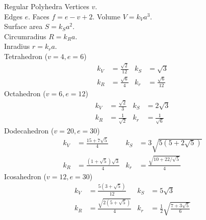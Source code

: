 \begin{algorithm}{Regular Polyhedra}
\desc
Vertices $v$.\\
Edges $e$.
Faces $f = e-v+2$.
Volume $V = k_V a^3$.\\
Surface area $S = k_S a^2$.\\
Circumradius $R = k_R a$.\\
Inradius $r = k_r a$.\\

Tetrahedron ($v = 4, e = 6$)
\begin{align*} 
  k_V &= \frac{\sqrt{2}}{12} & k_S &= \sqrt{3}\\
  k_R &= \frac{\sqrt{6}}{4}    & k_r &= \frac{\sqrt{6}}{12}
\end{align*}
Octahedron ($v = 6, e = 12$)
\begin{align*} 
  k_V &= \frac{\sqrt{2}}{3} & k_S &= 2\sqrt{3}\\
  k_R &= \frac{1}{\sqrt{2}}    & k_r &= \frac{1}{\sqrt{6}}
\end{align*}
Dodecahedron ($v = 20, e = 30$)
\begin{align*} 
  k_V &= \frac{15 + 7\sqrt{5}}{4} & k_S &= 3\sqrt{5(5+2\sqrt{5})}\\
  k_R &= \frac{(1+\sqrt{5})\sqrt{3}}{4} & k_r &= \frac{\sqrt{10 + 22/\sqrt{5}}}{4}
\end{align*}
Icosahedron ($v = 12, e = 30$)
\begin{align*}
  k_V &= \frac{5(3 + \sqrt{5})}{12} & k_S &= 5\sqrt{3}\\
  k_R &= \frac{\sqrt{2(5+\sqrt{5})}}{4} & k_r &= \frac{1}{2}\sqrt{\frac{7+3\sqrt{5}}{6}}
\end{align*}
  
\end{algorithm}